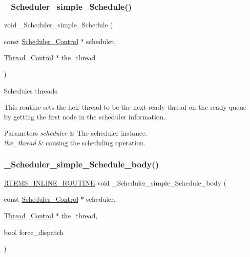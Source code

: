 \subsubsection{\texorpdfstring{\_Scheduler\_simple\_Schedule()}{\_Scheduler\_simple\_Schedule()}}
{\footnotesize\ttfamily void \+\_\+\+Scheduler\+\_\+simple\+\_\+\+Schedule (\begin{DoxyParamCaption}\item[{const \mbox{\hyperlink{struct__Scheduler__Control}{Scheduler\+\_\+\+Control}} $\ast$}]{scheduler,  }\item[{\mbox{\hyperlink{struct__Thread__Control}{Thread\+\_\+\+Control}} $\ast$}]{the\+\_\+thread }\end{DoxyParamCaption})}



Schedules threads. 

This routine sets the heir thread to be the next ready thread on the ready queue by getting the first node in the scheduler information.


\begin{DoxyParams}{Parameters}
{\em scheduler} & The scheduler instance. \\
\hline
{\em the\+\_\+thread} & causing the scheduling operation. \\
\hline
\end{DoxyParams}
\mbox{\label{group__RTEMSScoreSchedulerSimple_gad87c281f617f598c1e175f162224d6fb}} 
\subsubsection{\texorpdfstring{\_Scheduler\_simple\_Schedule\_body()}{\_Scheduler\_simple\_Schedule\_body()}}
{\footnotesize\ttfamily \mbox{\hyperlink{group__RTEMSScoreBaseDefs_gac216239df231d5dbd15e3520b0b9313f}{R\+T\+E\+M\+S\+\_\+\+I\+N\+L\+I\+N\+E\+\_\+\+R\+O\+U\+T\+I\+NE}} void \+\_\+\+Scheduler\+\_\+simple\+\_\+\+Schedule\+\_\+body (\begin{DoxyParamCaption}\item[{const \mbox{\hyperlink{struct__Scheduler__Control}{Scheduler\+\_\+\+Control}} $\ast$}]{scheduler,  }\item[{\mbox{\hyperlink{struct__Thread__Control}{Thread\+\_\+\+Control}} $\ast$}]{the\+\_\+thread,  }\item[{bool}]{force\+\_\+dispatch }\end{DoxyParamCaption})}



